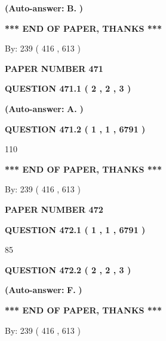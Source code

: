 \documentclass[12pt]{article}
\begin{document}
 
{\textbf{(Auto-answer:}}
{\textbf{\large{
B.}}}
{\textbf{)}}
 
 
   
   
   
   
\vspace{1.0in} 
{\textbf{\large{ *** END OF PAPER, THANKS *** }}} 
   
   
\hspace{1.0in} By: 
 239 ( 416 ,  613 )
   
   
   
   
\newpage 
\setcounter{page}{ 
   471001 } 
   
   
 {\textbf{ \Large{ PAPER NUMBER  471  }}}
   
   
   
   
  
  
{\textbf{\large{QUESTION
471.1 
 ( 2 , 2 , 3 )
}}}
 
 
{\textbf{(Auto-answer:}}
{\textbf{\large{
A.}}}
{\textbf{)}}
 
 
  
  
{\textbf{\large{QUESTION
471.2 
 ( 1 , 1 , 6791 )
}}}

110
   
   
   
   
\vspace{1.0in} 
{\textbf{\large{ *** END OF PAPER, THANKS *** }}} 
   
   
\hspace{1.0in} By: 
 239 ( 416 ,  613 )
   
   
   
   
\newpage 
\setcounter{page}{ 
   472001 } 
   
   
 {\textbf{ \Large{ PAPER NUMBER  472  }}}
   
   
   
   
  
  
{\textbf{\large{QUESTION
472.1 
 ( 1 , 1 , 6791 )
}}}

85
  
  
{\textbf{\large{QUESTION
472.2 
 ( 2 , 2 , 3 )
}}}
 
 
{\textbf{(Auto-answer:}}
{\textbf{\large{
F.}}}
{\textbf{)}}
 
 
   
   
   
   
\vspace{1.0in} 
{\textbf{\large{ *** END OF PAPER, THANKS *** }}} 
   
   
\hspace{1.0in} By: 
 239 ( 416 ,  613 )
   
   
   
\end{document}

